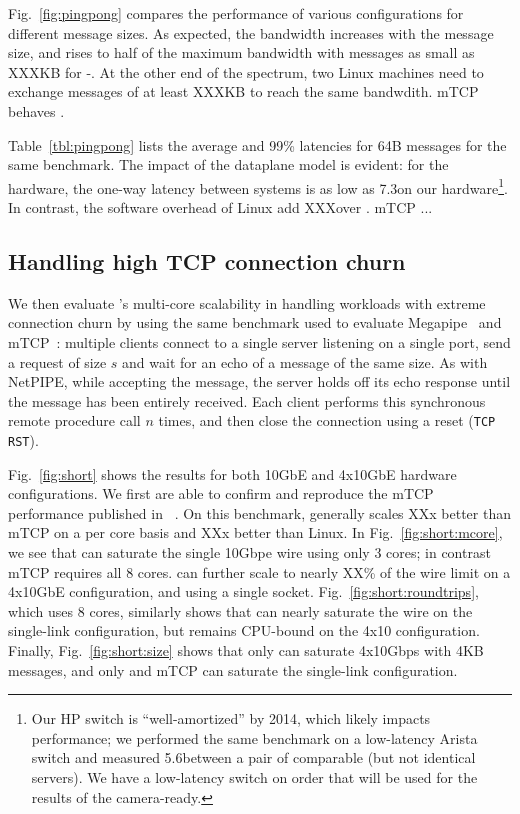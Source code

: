Fig.~\ref{fig:pingpong} compares the performance of various
configurations for different message sizes.  As expected, the
bandwidth increases with the message size, and rises to half of the
maximum bandwidth with messages as small as XXXKB for \ix-\ix.  At the
other end of the spectrum, two Linux machines need to exchange
messages of at least XXXKB to reach the same bandwdith.  mTCP behaves
.

Table~\ref{tbl:pingpong} lists the average and 99\% latencies for 64B
messages for the same benchmark.  The impact of the \ix dataplane
model is evident: for the hardware, the one-way latency between \ix
systems is as low as 7.3\microsecond on our hardware\footnote{Our
HP switch is ``well-amortized'' by 2014, which likely impacts
  performance; we performed the same benchmark on a low-latency Arista
  switch and measured 5.6\microsecond between a pair of comparable
  (but not identical servers). We have a low-latency switch on order
  that will be used for the results of the camera-ready.}.  In
contrast, the software overhead of Linux add XXX\microsecond over \ix.
mTCP ... 


\subsection{Handling high TCP connection churn}
\label{sec:eval:short}



We then evaluate \ix's multi-core scalability in handling workloads
with extreme connection churn by using the same benchmark used to evaluate
Megapipe~\cite{han2012megapipe} and mTCP~\cite{jeong2014mtcp}:
multiple clients connect to a single server listening on a single
port, send a request of size $s$ and wait for an echo of a message of
the same size.  As with NetPIPE, while accepting the message, the server holds off its
echo response until the message has been entirely received.
Each client performs this synchronous remote procedure
call $n$ times, and then close the connection using a reset
(\texttt{TCP RST}).


 Fig.~\ref{fig:short} shows the results for both
10GbE and 4x10GbE hardware configurations.  We first
are able to confirm and reproduce the mTCP performance published in
~\cite{jeong2014mtcp}.  On this benchmark, \ix generally scales XXx
better than mTCP on a per core basis and XXx better than Linux.  In
Fig.~\ref{fig:short:mcore}, we see that \ix can saturate the single
10Gbpe wire using only 3 cores; in contrast mTCP requires all 8
cores. \ix can further scale to nearly XX\% of the wire limit on a
4x10GbE configuration, and using a single socket.
Fig.~\ref{fig:short:roundtrips}, which uses 8 cores, similarly shows
that \ix can nearly saturate the wire on the single-link
configuration, but remains CPU-bound on the 4x10 configuration.
Finally, Fig.~\ref{fig:short:size} shows that only \ix can saturate
4x10Gbps with 4KB messages, and only \ix and mTCP can saturate the
single-link configuration.


